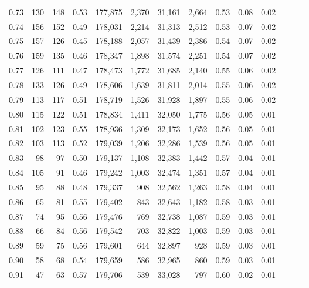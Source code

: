 \begin{tabular}{rrrrrrrrrrrrrr}
0.73 &    130 &  148 &  0.53 &  177,875 &    2,370 &  31,161 &   2,664 &  0.53 &  0.08 &      0.02 \\
0.74 &    156 &  152 &  0.49 &  178,031 &    2,214 &  31,313 &   2,512 &  0.53 &  0.07 &      0.02 \\
0.75 &    157 &  126 &  0.45 &  178,188 &    2,057 &  31,439 &   2,386 &  0.54 &  0.07 &      0.02 \\
0.76 &    159 &  135 &  0.46 &  178,347 &    1,898 &  31,574 &   2,251 &  0.54 &  0.07 &      0.02 \\
0.77 &    126 &  111 &  0.47 &  178,473 &    1,772 &  31,685 &   2,140 &  0.55 &  0.06 &      0.02 \\
0.78 &    133 &  126 &  0.49 &  178,606 &    1,639 &  31,811 &   2,014 &  0.55 &  0.06 &      0.02 \\
0.79 &    113 &  117 &  0.51 &  178,719 &    1,526 &  31,928 &   1,897 &  0.55 &  0.06 &      0.02 \\
0.80 &    115 &  122 &  0.51 &  178,834 &    1,411 &  32,050 &   1,775 &  0.56 &  0.05 &      0.01 \\
0.81 &    102 &  123 &  0.55 &  178,936 &    1,309 &  32,173 &   1,652 &  0.56 &  0.05 &      0.01 \\
0.82 &    103 &  113 &  0.52 &  179,039 &    1,206 &  32,286 &   1,539 &  0.56 &  0.05 &      0.01 \\
0.83 &     98 &   97 &  0.50 &  179,137 &    1,108 &  32,383 &   1,442 &  0.57 &  0.04 &      0.01 \\
0.84 &    105 &   91 &  0.46 &  179,242 &    1,003 &  32,474 &   1,351 &  0.57 &  0.04 &      0.01 \\
0.85 &     95 &   88 &  0.48 &  179,337 &      908 &  32,562 &   1,263 &  0.58 &  0.04 &      0.01 \\
0.86 &     65 &   81 &  0.55 &  179,402 &      843 &  32,643 &   1,182 &  0.58 &  0.03 &      0.01 \\
0.87 &     74 &   95 &  0.56 &  179,476 &      769 &  32,738 &   1,087 &  0.59 &  0.03 &      0.01 \\
0.88 &     66 &   84 &  0.56 &  179,542 &      703 &  32,822 &   1,003 &  0.59 &  0.03 &      0.01 \\
0.89 &     59 &   75 &  0.56 &  179,601 &      644 &  32,897 &     928 &  0.59 &  0.03 &      0.01 \\
0.90 &     58 &   68 &  0.54 &  179,659 &      586 &  32,965 &     860 &  0.59 &  0.03 &      0.01 \\
0.91 &     47 &   63 &  0.57 &  179,706 &      539 &  33,028 &     797 &  0.60 &  0.02 &      0.01 \\

\end{tabular}
